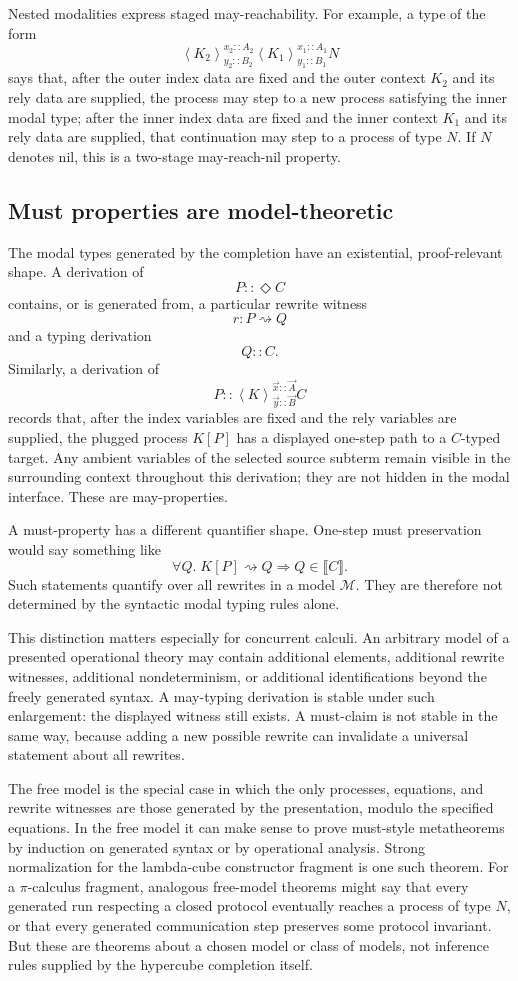 \documentclass[11pt]{article}
\newcommand{\rw}{\rightsquigarrow}
\newcommand{\ty}{\mathrel{::}}
\newcommand{\Dia}{\Diamond}
\newcommand{\Mod}[4]{\left\langle #1\right\rangle^{#2}_{#3} #4}
\begin{document}
Nested modalities express staged may-reachability.  For example, a type of
the form
\[
  \Mod{K_2}{x_2\ty A_2}{y_2\ty B_2}
    {\Mod{K_1}{x_1\ty A_1}{y_1\ty B_1}{N}}
\]
says that, after the outer index data are fixed and the outer context \(K_2\) and its rely data are supplied,
the process may step to a new process satisfying the inner modal type; after
the inner index data are fixed and the inner context \(K_1\) and its rely data are supplied, that continuation
may step to a process of type \(N\).  If \(N\) denotes nil, this is a
two-stage may-reach-nil property.

\subsection{Must properties are model-theoretic}

The modal types generated by the completion have an existential, proof-relevant
shape.  A derivation of
\[
  P\ty\Dia C
\]
contains, or is generated from, a particular rewrite witness
\[
  r:P\rw Q
\]
and a typing derivation
\[
  Q\ty C.
\]
Similarly, a derivation of
\[
  P\ty\Mod{K}{\vec{x}\ty\vec{A}}{\vec{y}\ty\vec{B}}{C}
\]
records that, after the index variables are fixed and the rely variables are supplied, the plugged process
\(K[P]\) has a displayed one-step path to a \(C\)-typed target.  Any ambient
variables of the selected source subterm remain visible in the surrounding
context throughout this derivation; they are not hidden in the modal interface.
These are may-properties.

A must-property has a different quantifier shape.  One-step must preservation
would say something like
\[
  \forall Q.\;
  K[P]\rw Q
  \Longrightarrow
  Q\in\llbracket C\rrbracket.
\]
Such statements quantify over all rewrites in a model \(\mathcal M\).  They are therefore not determined by the syntactic modal typing rules alone.

This distinction matters especially for concurrent calculi.  An arbitrary model of a presented operational theory may contain additional elements, additional rewrite witnesses, additional nondeterminism, or additional identifications beyond the freely generated syntax.  A may-typing derivation is stable under such enlargement: the displayed witness still exists.  A must-claim is not stable in the same way, because adding a new possible rewrite can invalidate a universal statement about all rewrites.

The free model is the special case in which the only processes, equations, and rewrite witnesses are those generated by the presentation, modulo the specified equations.  In the free model it can make sense to prove must-style metatheorems by induction on generated syntax or by operational analysis.  Strong normalization for the lambda-cube constructor fragment is one such theorem.  For a \(\pi\)-calculus fragment, analogous free-model theorems might say that every generated run respecting a closed protocol eventually reaches a process of type \(N\), or that every generated communication step preserves some protocol invariant.  But these are theorems about a chosen model or class of models, not inference rules supplied by the hypercube completion itself.
\end{document}
